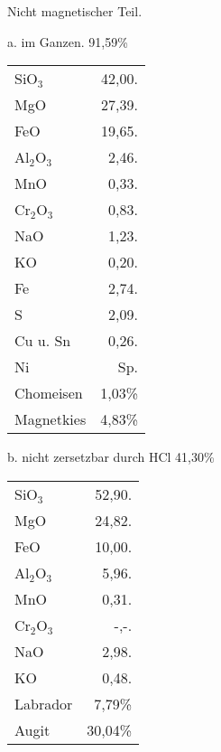 \documentclass[a4paper, 11pt, oneside]{article}
\begin{document}
\begin{center}
Nicht magnetischer Teil.
\end{center}

\begin{center}
a. im Ganzen. 91,59\%
\end{center}

\begin{table}[H]
    \centering\swabfamily\Large
    \begin{tabular}{l r}
        SiO$_{3}$ & 42,00. \\
        MgO & 27,39. \\
        FeO & 19,65. \\
        Al$_{2}$O$_{3}$ & 2,46. \\
        MnO & 0,33. \\
        Cr$_{2}$O$_{3}$ & 0,83. \\
        NaO & 1,23. \\
        KO & 0,20. \\
        Fe & 2,74. \\
        S & 2,09. \\
        Cu u. Sn  & 0,26. \\
        Ni & Sp. \\
        Chomeisen & 1,03\% \\
        Magnetkies & 4,83\% \\
    \end{tabular}
\end{table}

\begin{center}
b. nicht zersetzbar durch HCl 41,30\%
\end{center}

\begin{table}[H]
    \centering\swabfamily\Large
    \begin{tabular}{l r}
        SiO$_{3}$ & 52,90. \\
        MgO & 24,82. \\
        FeO & 10,00. \\
        Al$_{2}$O$_{3}$ & 5,96. \\
        MnO & 0,31. \\
        Cr$_{2}$O$_{3}$ & -,-. \\
        NaO & 2,98. \\
        KO & 0,48. \\ \hline
        Labrador & 7,79\% \\
        Augit & 30,04\% \\
    \end{tabular}
\end{table}
\end{document}
